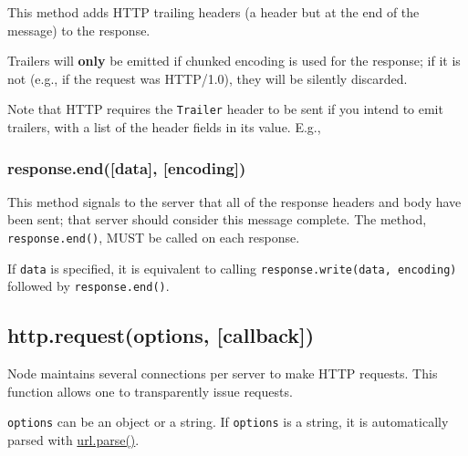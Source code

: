 This method adds HTTP trailing headers (a header but at the end of the
message) to the response.

Trailers will \textbf{only} be emitted if chunked encoding is used for
the response; if it is not (e.g., if the request was HTTP/1.0), they
will be silently discarded.

Note that HTTP requires the \texttt{Trailer} header to be sent if you
intend to emit trailers, with a list of the header fields in its value.
E.g.,

\begin{Shaded}
\begin{Highlighting}[]
\NormalTok{(}\NormalTok{, \{ }\NormalTok{: }\NormalTok{,}
                          \NormalTok{: } \NormalTok{\});}
\NormalTok{(\{}\NormalTok{: }\NormalTok{\});}
\NormalTok{();}
\end{Highlighting}
\end{Shaded}

\subsubsection{response.end({[}data{]},
{[}encoding{]})}\label{response.enddata-encoding}

This method signals to the server that all of the response headers and
body have been sent; that server should consider this message complete.
The method, \texttt{response.end()}, MUST be called on each response.

If \texttt{data} is specified, it is equivalent to calling
\texttt{response.write(data, encoding)} followed by
\texttt{response.end()}.

\subsection{http.request(options,
{[}callback{]})}\label{http.requestoptions-callback}

Node maintains several connections per server to make HTTP requests.
This function allows one to transparently issue requests.

\texttt{options} can be an object or a string. If \texttt{options} is a
string, it is automatically parsed with
\href{url.html\#url_url_parse_urlstr_parsequerystring_slashesdenotehost}{url.parse()}.

